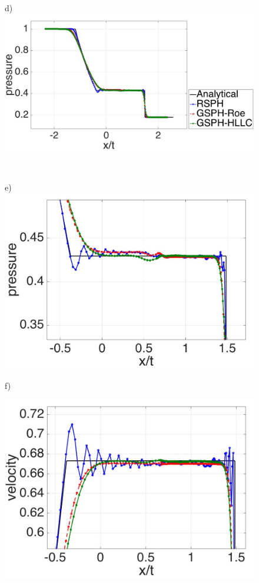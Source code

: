 \begin{figure}[H]
\begin{minipage}{.45\textwidth}
    \end{minipage}%
    \begin{minipage}{.545 \textwidth}
        \centering d)
        \includegraphics[width=0.99 \textwidth,height=0.4954\textwidth]{./Figures/RCM-Sod-GSPH-compare-p}
    \end{minipage}%
    \\
    \begin{minipage}{.45\textwidth}
        \centering e)
        \includegraphics[width= 0.99 \textwidth, height=0.625 \textwidth]{./Figures/RCM-Sod-GSPH-compare-p-zoom}    
    \end{minipage}%
    \begin{minipage}{.545\textwidth}
        \centering f)
        \begin{flushleft}
        \includegraphics[width= 0.8174 \textwidth, height=0.4954 \textwidth]{./Figures/RCM-Sod-GSPH-compare-v-zoom}    

\end{flushleft}
\end{minipage}
\end{figure}
